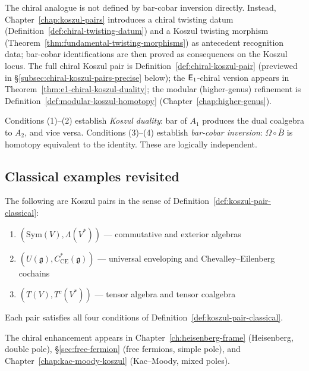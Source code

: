 \noindent
The chiral analogue is not defined by bar-cobar inversion directly.
Instead, Chapter~\ref{chap:koszul-pairs} introduces a chiral twisting
datum (Definition~\ref{def:chiral-twisting-datum}) and a Koszul twisting
morphism (Theorem~\ref{thm:fundamental-twisting-morphisms}) as antecedent
recognition data; bar-cobar identifications are then proved as
consequences on the Koszul locus.
The full chiral Koszul pair is
Definition~\ref{def:chiral-koszul-pair} (previewed in
\S\ref{subsec:chiral-koszul-pairs-precise} below);
the $\mathsf{E}_1$-chiral version appears in
Theorem~\ref{thm:e1-chiral-koszul-duality};
the modular (higher-genus) refinement is
Definition~\ref{def:modular-koszul-homotopy} (Chapter~\ref{chap:higher-genus}).

\begin{remark}
\label{rem:two-phenomena}
Conditions (1)--(2) establish \emph{Koszul duality}: bar of $A_1$ produces the dual coalgebra to $A_2$, and vice versa. Conditions (3)--(4) establish \emph{bar-cobar inversion}: $\Omega \circ \bar{B}$ is homotopy equivalent to the identity. These are logically independent.
\end{remark}

\subsection{Classical examples revisited}

\begin{theorem}
\label{thm:quadratic-koszul}
The following are Koszul pairs in the sense of Definition~\ref{def:koszul-pair-classical}:
\begin{enumerate}
\item $(\text{Sym}(V), \Lambda(V^*))$ — commutative and exterior algebras
\item $(U(\mathfrak{g}), C^*_{\text{CE}}(\mathfrak{g}))$ — universal enveloping and Chevalley--Eilenberg cochains
\item $(T(V), T^c(V^*))$ — tensor algebra and tensor coalgebra
\end{enumerate}
Each pair satisfies all four conditions of Definition~\ref{def:koszul-pair-classical}.
\end{theorem}

The chiral enhancement appears in Chapter~\ref{ch:heisenberg-frame} (Heisenberg, double pole), \S\ref{sec:free-fermion} (free fermions, simple pole), and Chapter~\ref{chap:kac-moody-koszul} (Kac--Moody, mixed poles).

